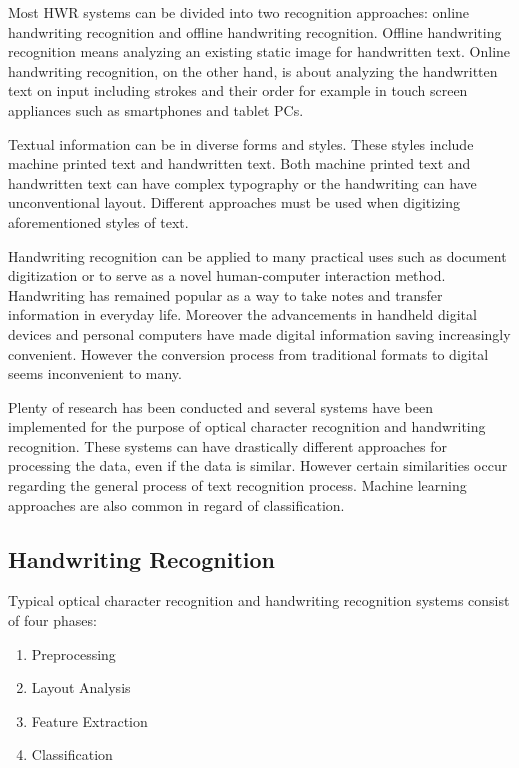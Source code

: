 \documentclass{article}
\begin{document}
    Most HWR systems can be divided into two recognition approaches: online handwriting recognition and offline handwriting recognition. Offline handwriting recognition means analyzing an existing static image for handwritten text. Online handwriting recognition, on the other hand, is about analyzing the handwritten text on input including strokes and their order for example in touch screen appliances such as smartphones and tablet PCs.

    Textual information can be in diverse forms and styles. These styles include machine printed text and handwritten text. Both machine printed text and handwritten text can have complex typography or the handwriting can have unconventional layout. Different approaches must be used when digitizing aforementioned styles of text.

    Handwriting recognition can be applied to many practical uses such as document digitization or to serve as a novel human-computer interaction method. Handwriting has remained popular as a way to take notes and transfer information in everyday life. Moreover the advancements in handheld digital devices and personal computers have made digital information saving increasingly convenient. However the conversion process from traditional formats to digital seems inconvenient to many.

    Plenty of research has been conducted and several systems have been implemented for the purpose of optical character recognition and handwriting recognition. These systems can have drastically different approaches for processing the data, even if the data is similar. However certain similarities occur regarding the general process of text recognition process. Machine learning approaches are also common in regard of classification.


  \subsection{Handwriting Recognition}
    Typical optical character recognition and handwriting recognition systems consist of four phases:

    \begin{enumerate}
      \item{Preprocessing}
      \item{Layout Analysis}
      \item{Feature Extraction}
      \item{Classification}
    \end{enumerate}
\end{document}
